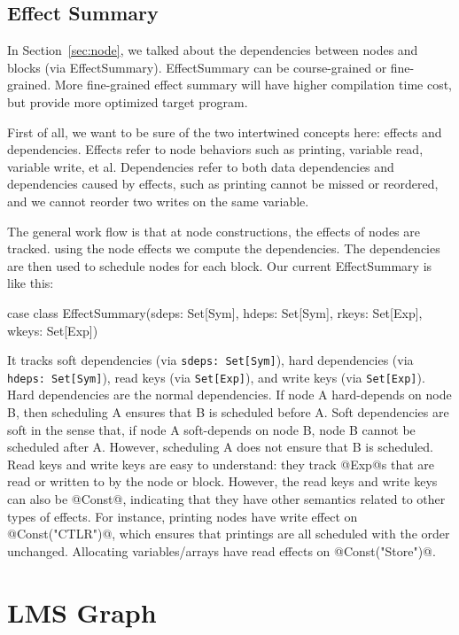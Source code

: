\subsection{Effect Summary}

In Section~\ref{sec:node}, we talked about the dependencies between nodes and blocks (via EffectSummary).
EffectSummary can be course-grained or fine-grained. More fine-grained effect summary will have
higher compilation time cost, but provide more optimized target program.

First of all, we want to be sure of the two intertwined concepts here: effects and dependencies.
Effects refer to node behaviors such as printing, variable read, variable write, et al.
Dependencies refer to both data dependencies and dependencies caused by effects, such as
printing cannot be missed or reordered, and we cannot reorder two writes on the same variable.

The general work flow is that at node constructions, the effects of nodes are tracked. using
the node effects we compute the dependencies. The dependencies are then used to schedule nodes
for each block. Our current EffectSummary is like this:

\begin{listing}[scala]
case class EffectSummary(sdeps: Set[Sym], hdeps: Set[Sym], rkeys: Set[Exp], wkeys: Set[Exp])
\end{listing}

It tracks soft dependencies (via \texttt{sdeps: Set[Sym]}), hard dependencies (via \texttt{hdeps: Set[Sym]}),
read keys (via \texttt{Set[Exp]}), and write keys (via \texttt{Set[Exp]}).
Hard dependencies are the normal dependencies. If node A hard-depends on node B, then scheduling A ensures
that B is scheduled before A.
Soft dependencies are soft in the sense that, if node A soft-depends on node B, node B cannot be scheduled after
A. However, scheduling A does not ensure that B is scheduled.
Read keys and write keys are easy to understand: they track @Exp@s that are read or written to by the node
or block. However, the read keys and write keys can also be @Const@, indicating that they have other
semantics related to other types of effects. For instance, printing nodes have write effect on @Const("CTLR")@,
which ensures that printings are all scheduled with the order unchanged.
Allocating variables/arrays have read effects on @Const("Store")@.

\section{LMS Graph}

